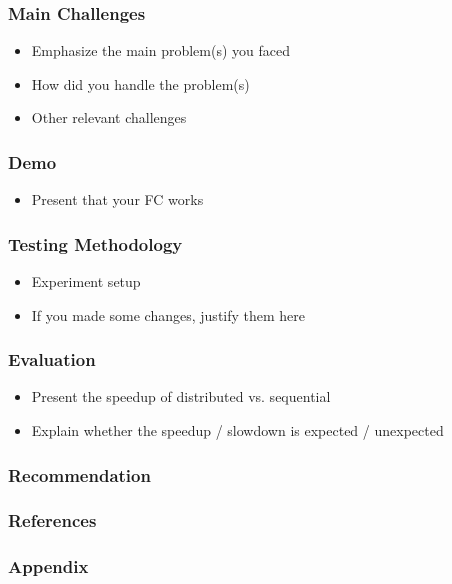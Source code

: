 \documentclass[11pt,t,usepdftitle=false,aspectratio=169]{beamer}
\begin{document}
\begin{frame}
\frametitle{Main Challenges}
    \begin{itemize}
        \item Emphasize the main problem(s) you faced
        \item How did you handle the problem(s)
        \item Other relevant challenges
    \end{itemize}
\end{frame}

\begin{frame}
\frametitle{Demo}
    \begin{itemize}
        \item Present that your FC works
    \end{itemize}
\end{frame}

\begin{frame}
\frametitle{Testing Methodology}
    \begin{itemize}
        \item Experiment setup
        \item If you made some changes, justify them here
    \end{itemize}
\end{frame}

\begin{frame}
\frametitle{Evaluation}
    \begin{itemize}
        \item Present the speedup of distributed vs. sequential
        \item Explain whether the speedup / slowdown is expected / unexpected
    \end{itemize}
\end{frame}

\begin{frame}
\frametitle{Recommendation}
\end{frame}




\begingroup

{\footnotesize
\begin{frame}
  \frametitle{References}
  \begin{minipage}[t]{1\textwidth}
    \vspace{1cm}
  \end{minipage}
\end{frame}
}

\begin{frame}
    \frametitle{Appendix}

\end{frame}
\endgroup
\end{document}
